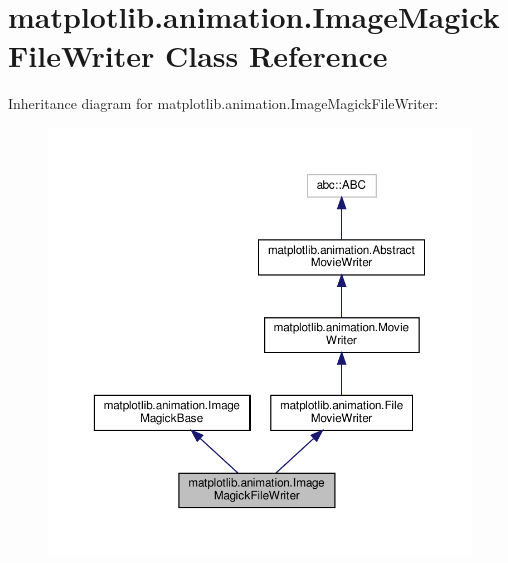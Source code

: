 \hypertarget{classmatplotlib_1_1animation_1_1ImageMagickFileWriter}{}\section{matplotlib.\+animation.\+Image\+Magick\+File\+Writer Class Reference}
\label{classmatplotlib_1_1animation_1_1ImageMagickFileWriter}


Inheritance diagram for matplotlib.\+animation.\+Image\+Magick\+File\+Writer\+:
\nopagebreak
\begin{figure}[H]
\begin{center}
\leavevmode
\includegraphics[width=350pt]{classmatplotlib_1_1animation_1_1ImageMagickFileWriter__inherit__graph}
\end{center}
\end{figure}


